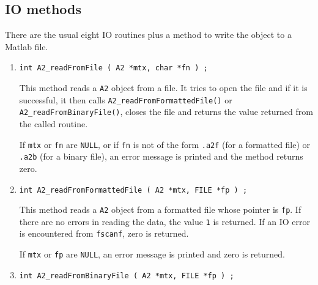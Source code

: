 \subsection{IO methods}
\label{subsection:A2:proto:IO}
\par
There are the usual eight IO routines plus a method to write the
object to a Matlab file.
\par
\begin{enumerate}
\item
\begin{verbatim}
int A2_readFromFile ( A2 *mtx, char *fn ) ;
\end{verbatim}
\par
This method reads a {\tt A2} object from a file.
It tries to open the file and if it is successful, 
it then calls {\tt A2\_readFromFormattedFile()} or
{\tt A2\_readFromBinaryFile()}, 
closes the file
and returns the value returned from the called routine.
\par {}
If {\tt mtx} or {\tt fn} are {\tt NULL}, 
or if {\tt fn} is not of the form
{\tt *.a2f} (for a formatted file) 
or {\tt *.a2b} (for a binary file),
an error message is printed and the method returns zero.
\item
\begin{verbatim}
int A2_readFromFormattedFile ( A2 *mtx, FILE *fp ) ;
\end{verbatim}
\par
This method reads a {\tt A2} object from a formatted file
whose pointer is {\tt fp}.
If there are no errors in reading the data, 
the value {\tt 1} is returned.
If an IO error is encountered from {\tt fscanf}, zero is returned.
\par {}
If {\tt mtx} or {\tt fp} are {\tt NULL},
an error message is printed and zero is returned.
\item
\begin{verbatim}
int A2_readFromBinaryFile ( A2 *mtx, FILE *fp ) ;
\end{verbatim}
\par

\end{enumerate}
